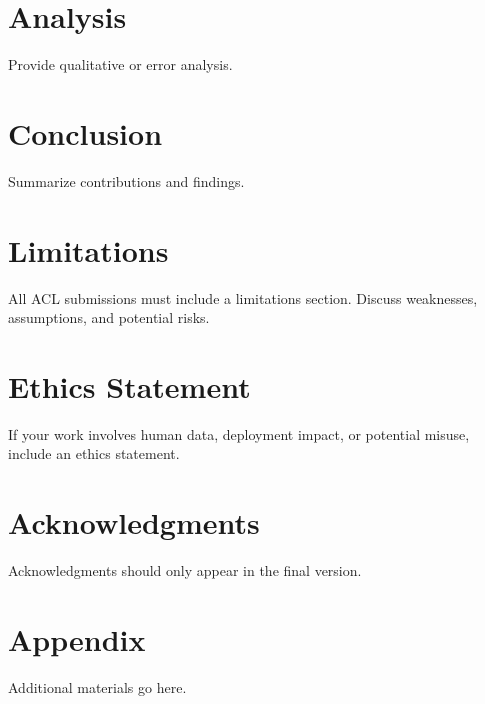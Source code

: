 \documentclass[11pt]{article}
\begin{document}
\section{Analysis}

Provide qualitative or error analysis.

\section{Conclusion}

Summarize contributions and findings.

\section*{Limitations}
All ACL submissions must include a limitations section.
Discuss weaknesses, assumptions, and potential risks.

\section*{Ethics Statement}
If your work involves human data, deployment impact,
or potential misuse, include an ethics statement.

\section*{Acknowledgments}
Acknowledgments should only appear in the final version.




\appendix

\section{Appendix}
Additional materials go here.
\end{document}
